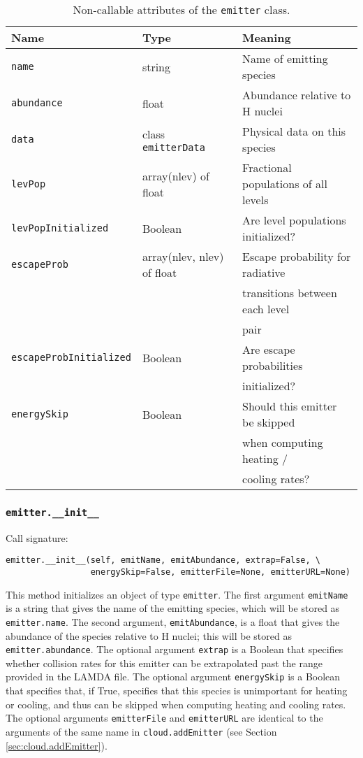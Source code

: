 \documentclass[12pt]{article}
\begin{document}
\begin{table}
\begin{center}
\begin{tabular}{lll}
\hline\hline
Name & Type & Meaning \\
\hline\hline
\texttt{name} & string & Name of emitting species \\
\texttt{abundance} & float & Abundance relative to H nuclei\\
\texttt{data} & class \texttt{emitterData} & Physical data on this species \\
\texttt{levPop} & array(nlev) of float & Fractional populations of all levels \\
\texttt{levPopInitialized} & Boolean & Are level populations initialized? \\
\texttt{escapeProb} & array(nlev, nlev) of float & Escape probability for radiative \\
& & \quad transitions between each level\\
& & \quad pair \\
\texttt{escapeProbInitialized} & Boolean & Are escape probabilities \\
& & \quad initialized? \\
\texttt{energySkip} & Boolean & Should this emitter be skipped\\
& & \quad when computing heating / \\
& & \quad cooling rates? \\
\hline
\end{tabular}
\caption{
\label{tab:emitter}
Non-callable attributes of the \texttt{emitter} class.
}
\end{center}
\end{table}

\subsubsection{\texttt{emitter.\_\_init\_\_}}

Call signature:

\begin{verbatim}
emitter.__init__(self, emitName, emitAbundance, extrap=False, \
                 energySkip=False, emitterFile=None, emitterURL=None)
\end{verbatim}

This method initializes an object of type \verb=emitter=. The first argument \verb=emitName= is a string that gives the name of the emitting species, which will be stored as \verb=emitter.name=. The second argument, \verb=emitAbundance=, is a float that gives the abundance of the species relative to H nuclei; this will be stored as \verb=emitter.abundance=. The optional argument \verb=extrap= is a Boolean that specifies whether collision rates for this emitter can be extrapolated past the range provided in the LAMDA file. The optional argument \verb=energySkip= is a Boolean that specifies that, if True, specifies that this species is unimportant for heating or cooling, and thus can be skipped when computing heating and cooling rates. The optional arguments \verb=emitterFile= and \verb=emitterURL= are identical to the arguments of the same name in \verb=cloud.addEmitter= (see Section \ref{sec:cloud.addEmitter}).
\end{document}
